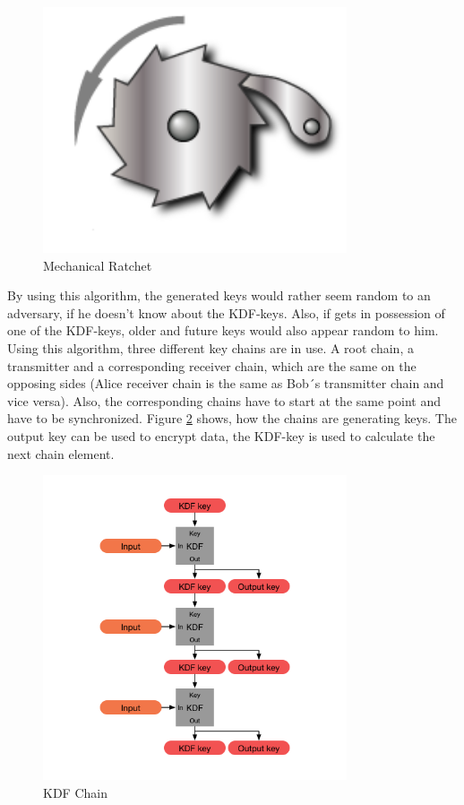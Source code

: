 \documentclass[12pt,oneside,a4paper,parskip]{scrbook}
\begin{document}
\begin{figure}[ht]
	\centering
  \includegraphics[width=0.8\textwidth]{ressources/ratchet.png}
  \caption{Mechanical Ratchet \parencite{pawl_rachet_2020}}
  \label{fig:ratchet}
\end{figure}

By using this algorithm, the generated keys would rather seem random to an adversary, if he doesn't know about the KDF-keys. Also, if gets in possession of one of the KDF-keys, older and future keys would also appear random to him. Using this algorithm, three different key chains are in use. A root chain, a transmitter and a corresponding receiver chain, which are the same on the opposing sides (Alice receiver chain is the same as Bob´s transmitter chain and vice versa). Also, the corresponding chains have to start at the same point and have to be synchronized. Figure \ref{fig:KDF_Chain} shows, how the chains are generating keys. The output key can be used to encrypt data, the KDF-key is used to calculate the next chain element.
\parencite{perrin_double_2016}

\begin{figure}[ht]
	\centering
  \includegraphics[width=0.8\textwidth]{ressources/kdf_chain.png}
  \caption{KDF Chain \parencite{perrin_double_2016}}
  \label{fig:KDF_Chain}
\end{figure}
\newpage
\end{document}
